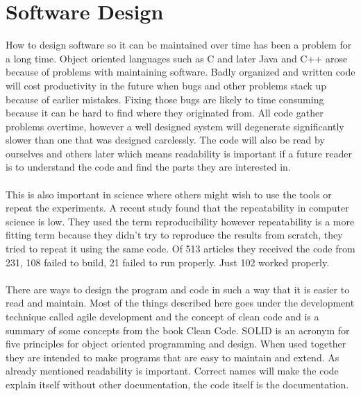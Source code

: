 \documentclass[10pt,a4paper]{report}
\begin{document}
\clearpage
\section{Software Design}
How to design software so it can be maintained over time has been a problem for a long time. Object oriented languages such as C and later Java and C++ arose because of problems with maintaining software. Badly organized and written code will cost productivity in the future when bugs and other problems stack up because of earlier mistakes. Fixing those bugs are likely to time consuming because it can be hard to find where they originated from. All code gather problems overtime, however a well designed system will degenerate significantly slower than one that was designed carelessly. The code will also be read by ourselves and others later which means readability is important if a future reader is to understand the code and find the parts they are interested in. \cite{cleancode2008, design_patterns}\\
\\
This is also important in science where others might wish to use the tools or repeat the experiments. A recent study\cite{comp_repro_2013} found that the repeatability in computer science is low. They used the term reproducibility however repeatability is a more fitting term because they didn't try to reproduce the results from scratch, they tried to repeat it using the same code. Of 513 articles they received the code from 231, 108 failed to build, 21 failed to run properly\cite{comp_repro_2013}. Just 102 worked properly\cite{comp_repro_2013}.\\
\\
There are ways to design the program and code in such a way that it is easier to read and maintain. Most of the things described here goes under the development technique called agile development and the concept of clean code and is a summary of some concepts from the book Clean Code\cite{cleancode2008}. SOLID is an acronym for five principles for object oriented programming and design\cite{cleancode2008}. When used together they are intended to make programs that are easy to maintain and extend\cite{cleancode2008}. As already mentioned readability is important. Correct names will make the code explain itself without other documentation, the code itself is the documentation\cite{cleancode2008}.
\end{document}
